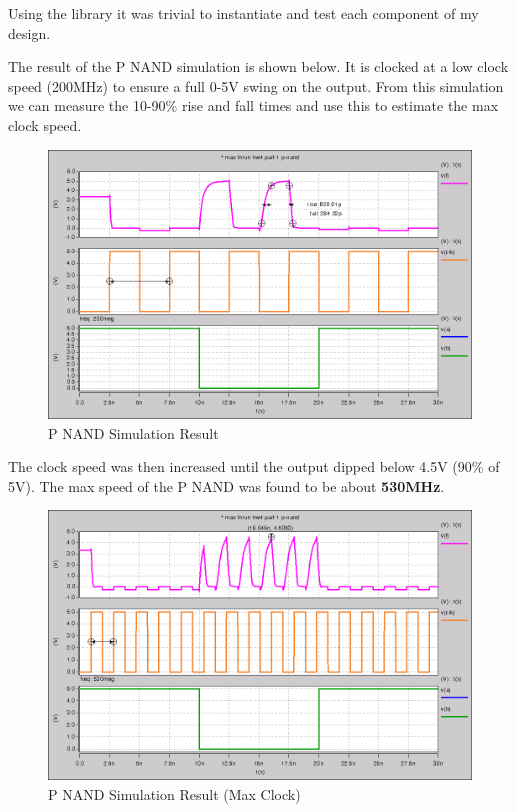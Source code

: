 \documentclass{article}
\begin{document}

\vspace{-\baselineskip}
Using the library it was trivial to instantiate and test each component of my design.




\newpage
The result of the P NAND simulation is shown below. It is clocked at a low
clock speed (200MHz) to ensure a full 0-5V swing on the output. From this
simulation we can measure the 10-90\% rise and fall times and use this to
estimate the max clock speed.

\begin{figure}[H]
    \centering
    \includegraphics[width=0.8\linewidth]{../part_1_p_nand.png}
    \caption{P NAND Simulation Result}
\end{figure}

The clock speed was then increased until the output dipped below 4.5V (90\% of
5V).  The max speed of the P NAND was found to be about \textbf{530MHz}.

\begin{figure}[H]
    \centering
    \includegraphics[width=0.8\linewidth]{../part_1_p_nand_fast.png}
    \caption{P NAND Simulation Result (Max Clock)}
\end{figure}
\end{document}
